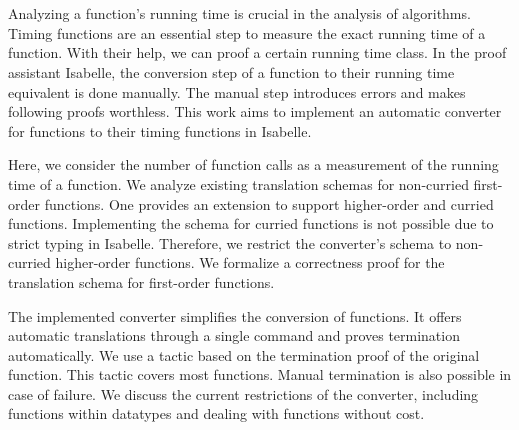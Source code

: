 \chapter{\abstractname}

Analyzing a function's running time is crucial in the analysis of algorithms.
Timing functions are an essential step to measure the exact running time of a function.
With their help, we can proof a certain running time class.
In the proof assistant Isabelle, the conversion step of a function to their running time equivalent is done manually.
The manual step introduces errors and makes following proofs worthless.
This work aims to implement an automatic converter for functions to their timing functions in Isabelle.

Here, we consider the number of function calls as a measurement of the running time of a function.
We analyze existing translation schemas for non-curried first-order functions.
One provides an extension to support higher-order and curried functions.
Implementing the schema for curried functions is not possible due to strict typing in Isabelle.
Therefore, we restrict the converter's schema to non-curried higher-order functions.
We formalize a correctness proof for the translation schema for first-order functions.

The implemented converter simplifies the conversion of functions.
It offers automatic translations through a single command and proves termination automatically.
We use a tactic based on the termination proof of the original function.
This tactic covers most functions.
Manual termination is also possible in case of failure.
We discuss the current restrictions of the converter, including functions within datatypes and dealing with functions without cost.
